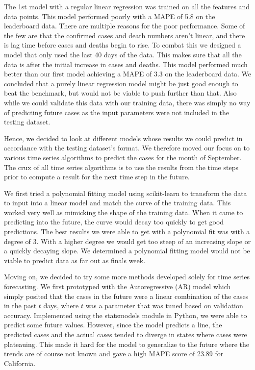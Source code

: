 \documentclass[sigconf]{acmart}
\begin{document}
The 1st model with a regular linear regression was trained on all the features and data points. This model performed poorly with a MAPE of 5.8 on the leaderboard data. There are multiple reasons for the poor performance. Some of the few are that the confirmed cases and death numbers aren't linear, and there is lag time before cases and deaths begin to rise. To combat this we designed a model that only used the last 40 days of the data. This makes sure that all the data is after the initial increase in cases and deaths. This model performed much better than our first model achieving a MAPE of 3.3 on the leaderboard data. We concluded that a purely linear regression model might be just good enough to beat the benchmark, but would not be viable to push further than that.  Also while we could validate this data with our training data, there was simply no way of predicting future cases as the input parameters were not included in the testing dataset. 

Hence, we decided to look at different models whose results we could predict in accordance with the testing dataset’s format. We therefore moved our focus on to various time series algorithms to predict the cases for the month of September. The crux of all time series algorithms is to use the results from the time steps prior to compute a result for the next time step in the future. 

We first tried a polynomial fitting model using scikit-learn to transform the data to input into a linear model and match the curve of the training data. This worked very well as mimicking the shape of the training data. When it came to predicting into the future, the curve would decay too quickly to get good predictions. The best results we were able to get with a polynomial fit was with a degree of 3. With a higher degree we would get too steep of an increasing slope or a quickly decaying slope. We determined a polynomial fitting model would not be viable to predict data as far out as finals week. 

Moving on, we decided to try some more methods developed solely for time series forecasting.
We first prototyped with the Autoregressive (AR) model which simply posited that the cases in the future were a linear combination of the cases in the past $t$ days, where $t$ was a parameter that was tuned based on validation accuracy. Implemented using the statsmodels \cite{statsmodels} module in Python, we were able to predict some future values. However, since the model predicts a line, the predicted cases and the actual cases tended to diverge in states where cases were plateauing. This made it hard for the model to generalize to the future where the trends are of course not known and gave a high MAPE score of 23.89 for California.
\end{document}
